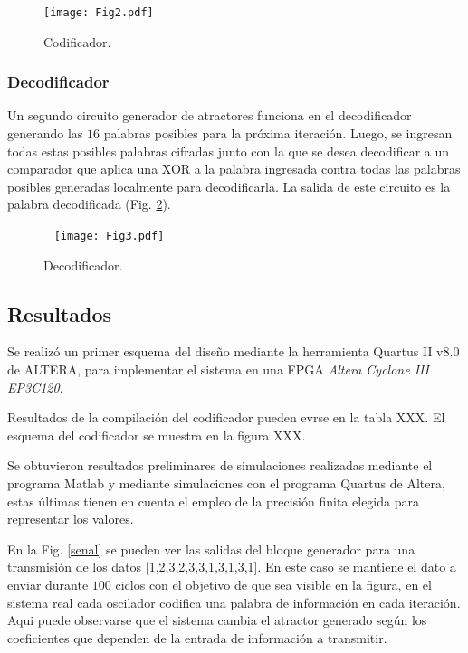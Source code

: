 \begin{figure}
    \centering
    \texttt{[image: Fig2.pdf]}\\
    \caption{Codificador.}\label{fig:codificador}
\end{figure}

\subsubsection{Decodificador}


Un segundo circuito generador de atractores funciona en el decodificador generando las $16$ palabras posibles para la próxima iteración. Luego, se ingresan todas estas posibles palabras
cifradas junto con la que se desea decodificar a un comparador que aplica una XOR a la palabra ingresada contra todas las palabras posibles generadas localmente para decodificarla. La
salida de este circuito es la palabra decodificada (Fig. \ref{fig:decodificador}).

\begin{figure}\
    \centering
    \texttt{[image: Fig3.pdf]}\\
    \caption{Decodificador.}\label{fig:decodificador}
\end{figure}

\subsection{Resultados}

Se realizó un primer esquema del diseño mediante la herramienta
Quartus II v8.0 de ALTERA, para implementar el sistema en una FPGA
\emph{Altera Cyclone III EP3C120}.

Resultados de la compilación del codificador pueden evrse en la
tabla XXX. El esquema del codificador se muestra en la figura XXX.

Se obtuvieron resultados preliminares de simulaciones realizadas
mediante el programa Matlab y mediante simulaciones con el
programa Quartus de Altera, estas últimas tienen en cuenta el
empleo de la precisión finita elegida para representar los
valores.

En la Fig. \ref{senal} se pueden ver las salidas del bloque
generador para una transmisión de los datos
[1,2,3,2,3,3,1,3,1,3,1]. En este caso se mantiene el dato a enviar
durante $100$ ciclos con el objetivo de que sea visible en la
figura, en el sistema real cada oscilador codifica una palabra de
información en cada iteración. Aqui puede observarse que el
sistema cambia el atractor generado según los coeficientes que
dependen de la entrada de información a transmitir.

